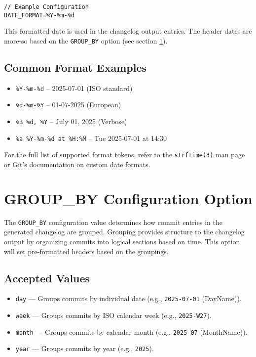\begin{lstlisting}[style=cppstyle]
// Example Configuration
DATE_FORMAT=%Y-%m-%d
\end{lstlisting}

This formatted date is used in the changelog output entries. The header dates are more-so based on the \texttt{GROUP_BY} option (see section \ref{sec:groupby}).

\subsection*{Common Format Examples}
\begin{itemize}
	\item \texttt{\%Y-\%m-\%d} – 2025-07-01 (ISO standard)
	\item \texttt{\%d-\%m-\%Y} – 01-07-2025 (European)
	\item \texttt{\%B \%d, \%Y} – July 01, 2025 (Verbose)
	\item \texttt{\%a \%Y-\%m-\%d at \%H:\%M} – Tue 2025-07-01 at 14:30
\end{itemize}

For the full list of supported format tokens, refer to the \texttt{strftime(3)}\cite{strftime(3)} man page or Git's documentation on custom date formats.










\section{GROUP\_BY Configuration Option}
\label{sec:groupby}

The \texttt{GROUP\_BY} configuration value determines how commit entries in the generated changelog are grouped. Grouping provides structure to the changelog output by organizing commits into logical sections based on time. This option will set pre-formatted headers based on the groupings.

\subsection*{Accepted Values}
\begin{itemize}
	\item \texttt{day} --- Groups commits by individual date (e.g., \texttt{2025-07-01} (DayName)).
	\item \texttt{week} --- Groups commits by ISO calendar week (e.g., \texttt{2025-W27}).
	\item \texttt{month} --- Groups commits by calendar month (e.g., \texttt{2025-07} (MonthName)).
	\item \texttt{year} --- Groups commits by year (e.g., \texttt{2025}).
\end{itemize}

